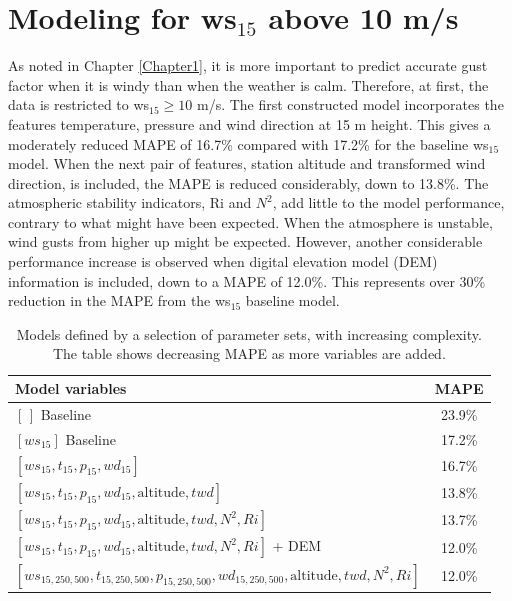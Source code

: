 \section{Modeling for ws$_{15}$ above 10 m/s}
As noted in Chapter \ref{Chapter1}, it is more important to predict accurate gust factor when it is windy than when the weather is calm. Therefore, at first, the data is restricted to ws$_{15} \geq 10$ m/s. The first constructed model incorporates the features temperature, pressure and wind direction at 15 m height. This gives a moderately reduced MAPE of 16.7\% compared with 17.2\% for the baseline ws$_{15}$ model. When the next pair of features, station altitude and transformed wind direction, is included, the MAPE is reduced considerably, down to 13.8\%. The atmospheric stability indicators, Ri and $N^2$, add little to the model performance, contrary to what might have been expected. When the atmosphere is unstable, wind gusts from higher up might be expected. However, another considerable performance increase is observed when digital elevation model (DEM) information is included, down to a MAPE of 12.0\%. This represents over 30\% reduction in the MAPE from the ws$_{15}$ baseline model.

\begin{table}[h]
  \caption[Model results for different sets of parameters.]{Models defined by a selection of parameter sets, with increasing complexity. The table shows decreasing MAPE as more variables are added.}
    \label{table:setsOfParams}
    \centering
    \begin{tabular}{lc}
        \toprule
        Model variables & MAPE\\
        \midrule
        $[\,]$ Baseline & 23.9\%\\
        $[ws_{15}]$ Baseline & 17.2\%\\
        $[ws_{15}, t_{15}, p_{15}, wd_{15}]$ & 16.7\% \\
        $[ws_{15}, t_{15}, p_{15}, wd_{15}, \text{altitude}, twd]$ & 13.8\% \\
        $[ws_{15}, t_{15}, p_{15}, wd_{15}, \text{altitude}, twd, N^2, Ri]$ & 13.7\%\\
        $[ws_{15}, t_{15}, p_{15}, wd_{15}, \text{altitude}, twd, N^2, Ri]$ + DEM & 12.0\%\\
        $[ws_{15,250,500}, t_{15,250,500}, p_{15,250,500}, wd_{15,250,500}, \text{altitude}, twd, N^2, Ri]$ & 12.0\% \\
        \bottomrule
    \end{tabular}
\end{table}

